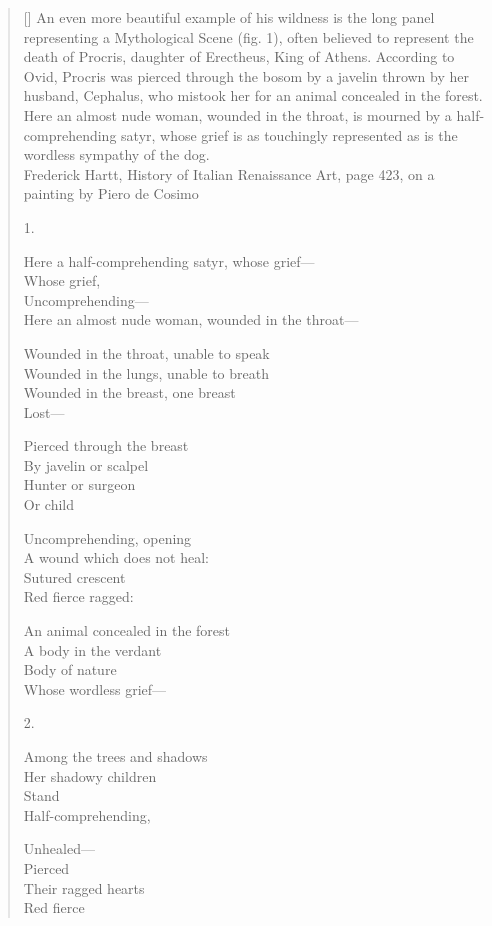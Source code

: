 \settowidth{\versewidth}{Here an almost nude woman, wounded in the throat---}
\begin{verse}[\versewidth]
An even more beautiful example of his wildness is the long panel representing a Mythological Scene (fig. 1), often believed to represent the death of Procris, daughter of Erectheus, King of Athens. According to Ovid, Procris was pierced through the bosom by a javelin thrown by her husband, Cephalus, who mistook her for an animal concealed in the forest.  Here an almost nude woman, wounded in the throat, is mourned by a half-comprehending satyr, whose grief is as touchingly represented as is the wordless sympathy of the dog.\\
Frederick Hartt, History of Italian Renaissance Art, page 423, on a painting by Piero de Cosimo

1.

Here a half-comprehending satyr, whose grief---\\
Whose grief,\\
Uncomprehending---\\
Here an almost nude woman, wounded in the throat---

Wounded in the throat, unable to speak\\
Wounded in the lungs, unable to breath\\
Wounded in the breast, one breast\\
Lost---

Pierced through the breast\\
By javelin or scalpel\\
Hunter or surgeon\\
Or child

Uncomprehending, opening\\
A wound which does not heal:\\
Sutured crescent\\
Red    fierce   ragged:

An animal concealed in the forest\\
A body in the verdant\\
Body of nature\\
Whose wordless grief---

2.

Among the trees and shadows\\
Her shadowy children\\
Stand\\
Half-comprehending,

Unhealed---\\
Pierced\\
Their ragged hearts\\
Red   fierce


\end{verse}

